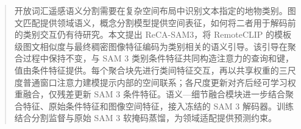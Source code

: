 \begin{abstract}
开放词汇遥感语义分割需要在复杂空间布局中识别文本指定的地物类别。图文匹配提供领域语义，概念分割模型提供空间表征，如何将二者用于解码前的类别交互仍有待研究。本文提出 ReCA-SAM3，将 RemoteCLIP 的模板级图文相似度与最终稠密图像特征编码为类别相关的语义引导。该引导在聚合过程中保持不变，与 SAM 3 类别条件特征共同构造注意力的查询和键，值由条件特征提供。每个聚合块先进行类间特征交互，再以共享权重的三尺度普通窗口注意力建模提示内部的空间联系；各尺度更新对齐后经可学习权重融合，仅残差更新 SAM 3 条件特征。语义—细节融合模块进一步结合聚合特征、原始条件特征和图像空间特征，接入冻结的 SAM 3 解码器。训练结合分割监督与原始 SAM 3 软掩码蒸馏，为领域适配提供预测约束。
\end{abstract}
